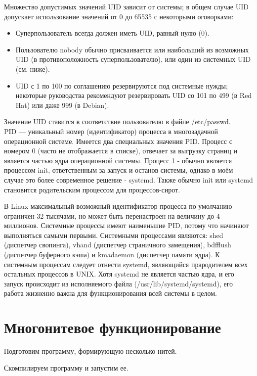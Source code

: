 \documentclass[a4paper]{article}
\begin{document}
	Множество допустимых значений UID зависит от системы; в общем случае UID допускает использование значений от 0 до 65535 с некоторыми оговорками:
	\begin{itemize}
		\item Суперпользователь всегда должен иметь UID, равный нулю (0).
		\item Пользователю nobody обычно присваивается или наибольший из возможных UID (в противоположность суперпользователю), или один из системных UID (см. ниже).
		\item UID с 1 по 100 по соглашению резервируются под системные нужды; некоторые руководства рекомендуют резервировать UID со 101 по 499 (в Red Hat) или даже 999 (в Debian).	
	\end{itemize}
	
	Значение UID ставится в соответствие пользователю в файле /etc/passwd.\\
	
	 PID --- уникальный номер (идентификатор) процесса в многозадачной операционной системе. Имеется два специальных значения PID. Процесс с номером 0 (часто не отображается в списке), отвечает за выгрузку страниц и является частью ядра операционной системы. Процесс 1 - обычно является процессом init, ответственным за запуск и останов системы, однако в моём случае это более современное решение - systemd. Также обычно init или systemd становится родительским процессом для процессов-сирот.

	В Linux максимальный возможный идентификатор процесса по умолчанию ограничен 32 тысячами, но может быть перенастроен на величину до 4 миллионов. Системные процессы имеют наименьшие PID, потому что начинают выполняться самыми первыми. Системными процессами являются: shed (диспетчер свопинга), vhand (диспетчер страничного замещения), bdfflush (диспетчер буферного кэша) и kmadaemon (диспетчер памяти ядра). К системным процессам следует отнести systemd, являющийся прародителем всех остальных процессов в UNIX. Хотя systemd не является частью ядра, и его запуск происходит из исполняемого файла (/usr/lib/systemd/systemd), его работа жизненно важна для функционирования всей системы в целом.
	
\section{Многонитевое функционирование}
	Подготовим программу, формирующую несколько нитей.
	
	
	Скомпилируем программу и запустим ее. 
	
	
\end{document}
